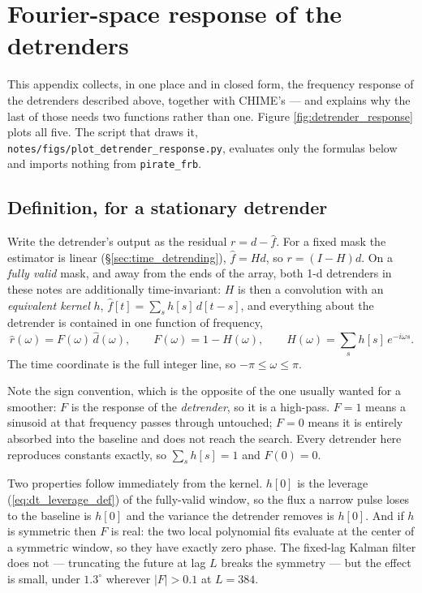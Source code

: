 \documentclass{article}
\numberwithin{equation}{section}   %
\begin{document}
\clearpage

\appendix

\section{Fourier-space response of the detrenders}
\label{sec:appendix_response}

This appendix collects, in one place and in closed form, the frequency response of the detrenders described
above, together with CHIME's --- and explains why the last of those needs two functions rather than one.
Figure \ref{fig:detrender_response} plots all five.  The script that draws it,
{\tt notes/figs/plot\_detrender\_response.py}, evaluates only the formulas below and imports nothing from
{\tt pirate\_frb}.

\subsection{Definition, for a stationary detrender}
\label{sec:ar_stationary}

Write the detrender's output as the residual $r = d - \hat f$.  For a fixed mask the estimator is linear
(\S\ref{sec:time_detrending}), $\hat f = Hd$, so $r = (I - H)d$.  On a {\em fully valid} mask, and away from
the ends of the array, both 1-d detrenders in these notes are additionally time-invariant: $H$ is then a
convolution with an {\em equivalent kernel} $h$, $\hat f[t] = \sum_s h[s]\,d[t-s]$, and everything about the
detrender is contained in one function of frequency,
\begin{equation}
\hat r(\omega) = F(\omega)\,\hat d(\omega),
\qquad
F(\omega) = 1 - H(\omega),
\qquad
H(\omega) = \sum_s h[s]\,e^{-i\omega s} .
\label{eq:ar_F}
\end{equation}
The time coordinate is the full integer line, so $-\pi \le \omega \le \pi$.

Note the sign convention, which is the opposite of the one usually wanted for a smoother: $F$ is the response
of the {\em detrender}, so it is a high-pass.  $F = 1$ means a sinusoid at that frequency passes through
untouched; $F = 0$ means it is entirely absorbed into the baseline and does not reach the search.  Every
detrender here reproduces constants exactly, so $\sum_s h[s] = 1$ and $F(0) = 0$.

Two properties follow immediately from the kernel.  $h[0]$ is the leverage
(\ref{eq:dt_leverage_def}) of the fully-valid window, so the flux a narrow pulse loses to the baseline is
$h[0]$ and the variance the detrender removes is $h[0]$.  And if $h$ is symmetric then $F$ is real: the two
local polynomial fits evaluate at the center of a symmetric window, so they have exactly zero phase.  The
fixed-lag Kalman filter does not --- truncating the future at lag $L$ breaks the symmetry --- but the effect
is small, under $1.3^\circ$ wherever $|F| > 0.1$ at $L = 384$.
\end{document}
